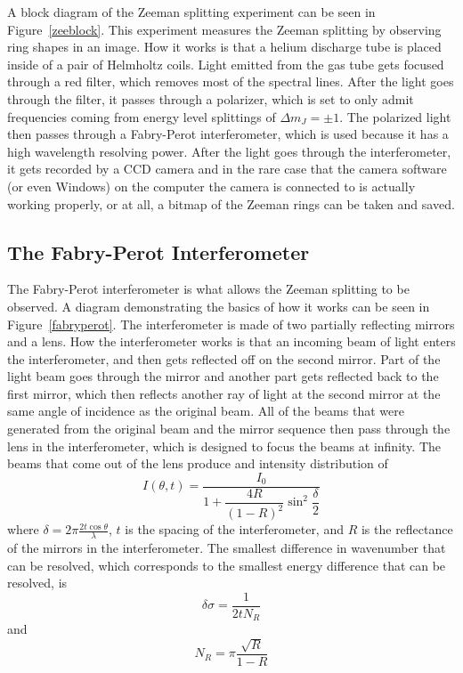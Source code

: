 \documentclass[11pt,letterpaper]{article}
\begin{document}
A block diagram of the Zeeman splitting experiment can be seen in
Figure~\ref{zeeblock}. This experiment measures the Zeeman splitting by
observing ring shapes in an image. How it works is that a helium discharge tube
is placed inside of a pair of Helmholtz coils. Light emitted from the gas tube
gets focused through a red filter, which removes most of the spectral lines.
After the light goes through the filter, it passes through a polarizer, which
is set to only admit frequencies coming from energy level splittings of
$\Delta m_J = \pm 1$. The polarized light then passes through a Fabry-Perot
interferometer, which is used because it has a high wavelength resolving power.
After the light goes through the interferometer, it gets recorded by a CCD
camera and in the rare case that the camera software (or even Windows) on the
computer the camera is connected to is actually working properly, or at all, a
bitmap of the Zeeman rings can be taken and saved.

\subsection{The Fabry-Perot Interferometer}

The Fabry-Perot interferometer is what allows the Zeeman splitting to be
observed. A diagram demonstrating the basics of how it works can be seen in
Figure~\ref{fabryperot}. The interferometer is made of two partially reflecting
mirrors and a lens. How the interferometer works is that an incoming beam of
light enters the interferometer, and then gets reflected off on the second
mirror. Part of the light beam goes through the mirror and another part gets
reflected back to the first mirror, which then reflects another ray of light at
the second mirror at the same angle of incidence as the original beam. All of
the beams that were generated from the original beam and the mirror sequence
then pass through the lens in the interferometer, which is designed to focus the
beams at infinity. The beams that come out of the lens produce and intensity
distribution of \cite{LabManual}
\begin{equation}
    I\left(\theta, t\right) = 
    \frac{I_0}{1 + \dfrac{4R}{\left(1-R\right)^2}\sin^2 \dfrac{\delta}{2}}
\end{equation}
where $\delta = 2\pi \frac{2t\cos\theta}{\lambda}$, $t$ is the spacing of the
interferometer, and $R$ is the reflectance of the mirrors in the interferometer.
The smallest difference in wavenumber that can be resolved, which corresponds to
the smallest energy difference that can be resolved, is \cite{LabManual}
\begin{equation}
    \delta \sigma = \frac{1}{2tN_R}
\end{equation}
and 
\begin{equation}
    N_R = \pi \frac{\sqrt{R}}{1-R}
\end{equation}
\end{document}
